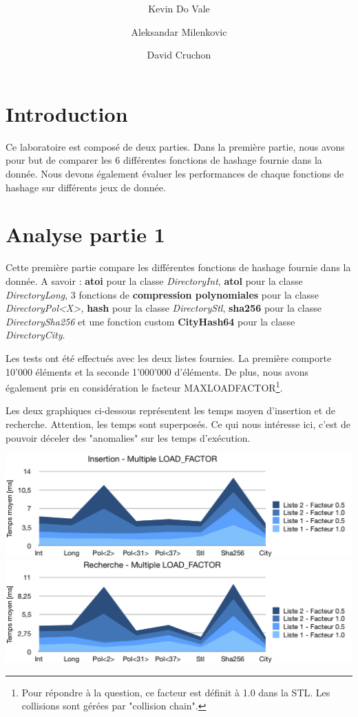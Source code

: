 \documentclass[11pt,a4paper]{article}
\author{Kevin Do Vale \and Aleksandar Milenkovic \and David Cruchon}
\title{{\normalsize \doccourse} \\ \doctitle }
\begin{document}
\lstset{language=C++}
\maketitle
\vspace{1em}

\section{Introduction}
Ce laboratoire est composé de deux parties.
Dans la première partie, nous avons pour but de comparer les 6 différentes fonctions de hashage fournie dans la donnée. Nous devons également évaluer les performances de chaque fonctions de hashage sur différents jeux de donnée.

\section{Analyse partie 1}
Cette première partie compare les différentes fonctions de hashage fournie dans la donnée. A savoir :
\textbf{atoi} pour la classe \textit{DirectoryInt}, \textbf{atol} pour la classe \textit{DirectoryLong}, 3 fonctions de \textbf{compression polynomiales} pour la classe \textit{DirectoryPol<X>,} \textbf{hash} pour la classe \textit{DirectoryStl}, \textbf{sha256} pour la classe \textit{DirectorySha256} et une fonction custom \textbf{CityHash64} pour la classe \textit{DirectoryCity}.

Les tests ont été effectués avec les deux listes fournies. La première comporte 10'000 éléments et la seconde 1'000'000 d'éléments. De plus, nous avons également pris en considération le facteur MAX\textunderscore LOAD\textunderscore FACTOR\footnote{Pour répondre à la question, ce facteur est définit à 1.0 dans la STL. Les collisions sont gérées par "collision chain".}.

Les deux graphiques ci-dessous représentent les temps moyen d'insertion et de recherche. Attention, les temps sont superposés. Ce qui nous intéresse ici, c'est de pouvoir déceler des "anomalies" sur les temps d'exécution.

\includegraphics[width=\textwidth,keepaspectratio]{insert_chart.png}
\includegraphics[width=\textwidth,keepaspectratio]{search_chart.png}
\end{document}
